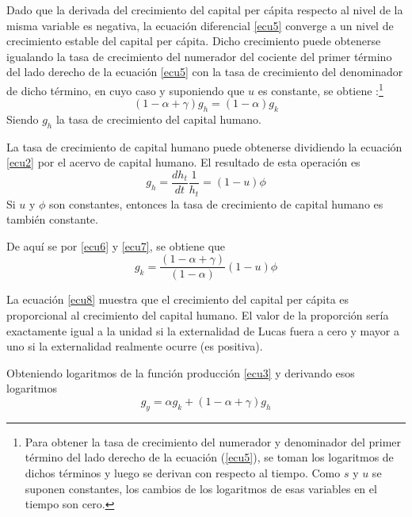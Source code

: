 \documentclass[12pt,a4paper]{report}
\begin{document}
	Dado que la derivada del crecimiento del capital per cápita respecto al nivel de la misma variable es negativa, la ecuación diferencial \ref{ecu5} converge a un nivel de crecimiento estable  del capital per cápita. Dicho crecimiento puede obtenerse igualando la tasa de crecimiento del numerador del cociente del primer término del lado derecho de la ecuación \ref{ecu5} con la tasa de crecimiento del denominador de dicho término, en cuyo caso y suponiendo que $u$ es constante, se obtiene :\footnote{Para obtener la tasa de crecimiento del numerador y denominador del primer término del lado derecho de la ecuación (\ref{ecu5}), se toman los logaritmos de dichos términos y luego se derivan con respecto al tiempo. Como $s$ y $u$ se suponen constantes, los cambios de los logaritmos de esas variables en el tiempo son cero.}
	\begin{equation}\label{ecu6}
		(1-\alpha + \gamma)g_h=(1-\alpha)g_k
	\end{equation}
	Siendo $g_h$ la tasa de crecimiento del capital humano.
	
	La tasa de crecimiento de capital humano puede obtenerse dividiendo la ecuación \ref{ecu2} por el acervo de capital humano. El resultado de esta operación es
	\begin{equation}\label{ecu7}
		g_h=\frac{dh_t}{dt}\frac{1}{h_t}=(1-u)\phi
	\end{equation}
	Si $u$ y $\phi$ son constantes, entonces la tasa de crecimiento de capital humano es también constante.
	
	De aquí se por \ref{ecu6} y \ref{ecu7}, se obtiene que
	\begin{equation}\label{ecu8}
		g_k=\frac{(1-\alpha +\gamma)}{(1-\alpha)}(1-u)\phi
	\end{equation}
	
	La ecuación \ref{ecu8} muestra que el crecimiento del capital per cápita es proporcional al crecimiento del capital humano. El valor de la proporción sería exactamente igual a la unidad si la externalidad de Lucas fuera a cero y mayor a uno si la externalidad realmente ocurre (es positiva).
	
	Obteniendo logaritmos de la función producción \ref{ecu3} y derivando esos logaritmos 
	\begin{equation}\label{ecu9}
		g_y=\alpha g_k + (1-\alpha +\gamma)g_h
	\end{equation}
	
\end{document}
